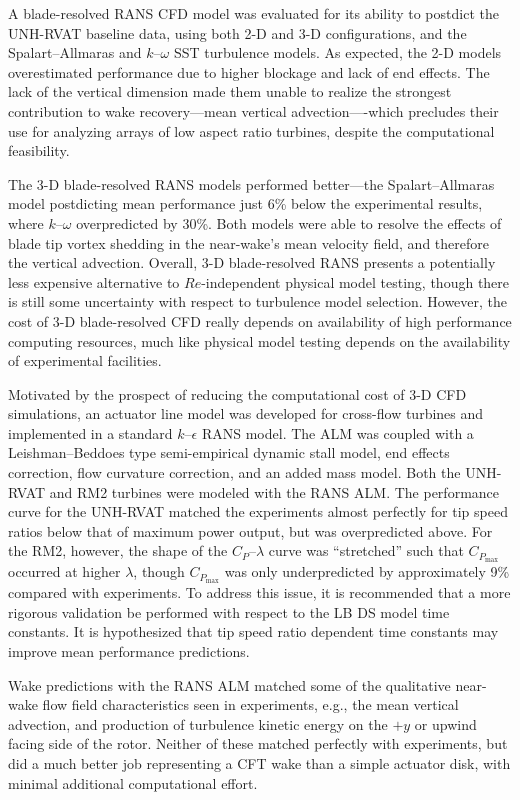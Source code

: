 A blade-resolved RANS CFD model was evaluated for its ability to postdict the
UNH-RVAT baseline data, using both 2-D and 3-D configurations, and the
Spalart--Allmaras and $k$--$\omega$ SST turbulence models. As expected, the 2-D
models overestimated performance due to higher blockage and lack of end effects.
The lack of the vertical dimension made them unable to realize the strongest
contribution to wake recovery---mean vertical advection----which precludes their
use for analyzing arrays of low aspect ratio turbines, despite the computational
feasibility.

The 3-D blade-resolved RANS models performed better---the Spalart--Allmaras
model postdicting mean performance just 6\% below the experimental results,
where $k$--$\omega$ overpredicted by 30\%. Both models were able to resolve the
effects of blade tip vortex shedding in the near-wake's mean velocity field, and
therefore the vertical advection. Overall, 3-D blade-resolved RANS presents a
potentially less expensive alternative to $Re$-independent physical model
testing, though there is still some uncertainty with respect to turbulence model
selection. However, the cost of 3-D blade-resolved CFD really depends on
availability of high performance computing resources, much like physical model
testing depends on the availability of experimental facilities.

Motivated by the prospect of reducing the computational cost of 3-D CFD
simulations, an actuator line model was developed for cross-flow turbines and
implemented in a standard $k$--$\epsilon$ RANS model. The ALM was coupled with a
Leishman--Beddoes type semi-empirical dynamic stall model, end effects
correction, flow curvature correction, and an added mass model. Both the
UNH-RVAT and RM2 turbines were modeled with the RANS ALM. The performance curve
for the UNH-RVAT matched the experiments almost perfectly for tip speed ratios
below that of maximum power output, but was overpredicted above. For the RM2,
however, the shape of the $C_P$--$\lambda$ curve was ``stretched'' such that
$C_{P_{\max}}$ occurred at higher $\lambda$, though $C_{P_{\max}}$ was only
underpredicted by approximately 9\% compared with experiments. To address this
issue, it is recommended that a more rigorous validation be performed with
respect to the LB DS model time constants. It is hypothesized that tip speed
ratio dependent time constants may improve mean performance predictions.

Wake predictions with the RANS ALM matched some of the qualitative near-wake
flow field characteristics seen in experiments, e.g., the mean vertical
advection, and production of turbulence kinetic energy on the $+y$ or upwind
facing side of the rotor. Neither of these matched perfectly with experiments,
but did a much better job representing a CFT wake than a simple actuator disk,
with minimal additional computational effort.

